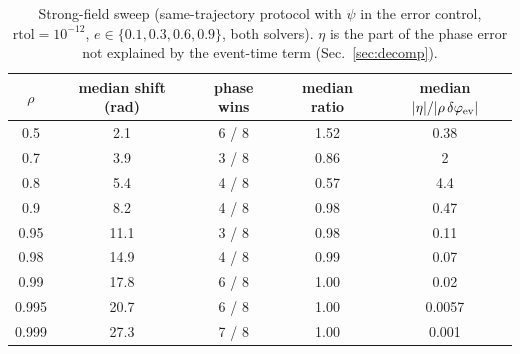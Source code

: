 \begin{table}[!htbp]
\centering
\caption{Strong-field sweep (same-trajectory protocol with $\psi$ in the error control, $\mathrm{rtol}=10^{-12}$, $e\in\{0.1,0.3,0.6,0.9\}$, both solvers). $\eta$ is the part of the phase error not explained by the event-time term (Sec.~\ref{sec:decomp}).}
\label{tab:strong}
\begin{tabular}{ccccc}
\toprule
$\rho$ & median shift (rad) & phase wins & median ratio & median $|\eta|/|\rho\,\delta\varphi_{\rm ev}|$ \\
\midrule
0.5 & 2.1 & 6 / 8 & 1.52 & 0.38 \\
0.7 & 3.9 & 3 / 8 & 0.86 & 2 \\
0.8 & 5.4 & 4 / 8 & 0.57 & 4.4 \\
0.9 & 8.2 & 4 / 8 & 0.98 & 0.47 \\
0.95 & 11.1 & 3 / 8 & 0.98 & 0.11 \\
0.98 & 14.9 & 4 / 8 & 0.99 & 0.07 \\
0.99 & 17.8 & 6 / 8 & 1.00 & 0.02 \\
0.995 & 20.7 & 6 / 8 & 1.00 & 0.0057 \\
0.999 & 27.3 & 7 / 8 & 1.00 & 0.001 \\
\bottomrule
\end{tabular}
\end{table}
